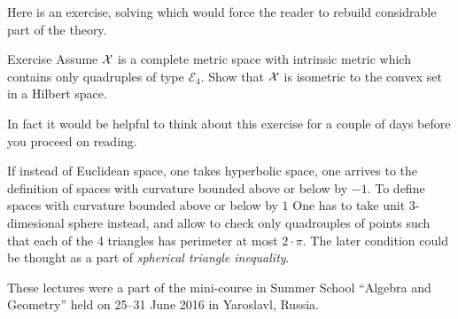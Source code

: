 Here is an exercise, solving which would force the reader to rebuild considrable part of the theory.

\begin{thm}{Exercise}
Assume $\mathcal{X}$ is a complete metric space with intrinsic metric
which contains only quadruples of type $\mathcal{E}_4$.
Show that $\mathcal{X}$ is isometric to the convex set in a Hilbert space.
\end{thm}

In fact it would be helpful to think about this exercise for a couple of days before you proceed on reading.

If instead of Euclidean space, one takes hyperbolic space,
one arrives to the definition of spaces with curvature bounded above or below by $-1$.
To define spaces with curvature bounded above or below by $1$
One has to take unit 3-dimesional sphere instead,
and allow to check only quadrouples of points such that each of the 4 triangles has perimeter at most $2\cdot\pi$.
The later condition could be thought as a part of \emph{spherical triangle inequality}.

\medskip

These lectures were a part of the mini-course in Summer School ``Algebra and Geometry'' held on 25--31 June 2016 in Yaroslavl, Russia.







